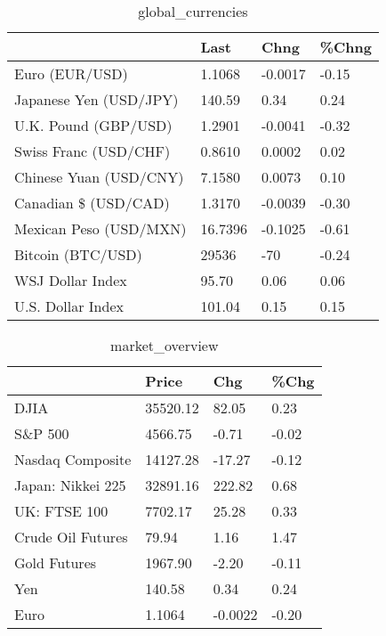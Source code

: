 \documentclass{article}%
\begin{document}
%


\begin{table}[htbp]%
\caption{global\_currencies}%
\centering%
\begin{adjustbox}{width=1\textwidth}%
\begin{tabular}{llll}
\toprule
                       &    Last &    Chng & \%Chng \\
\midrule
        Euro (EUR/USD) &  1.1068 & -0.0017 & -0.15 \\
Japanese Yen (USD/JPY) &  140.59 &    0.34 &  0.24 \\
  U.K. Pound (GBP/USD) &  1.2901 & -0.0041 & -0.32 \\
 Swiss Franc (USD/CHF) &  0.8610 &  0.0002 &  0.02 \\
Chinese Yuan (USD/CNY) &  7.1580 &  0.0073 &  0.10 \\
  Canadian \$ (USD/CAD) &  1.3170 & -0.0039 & -0.30 \\
Mexican Peso (USD/MXN) & 16.7396 & -0.1025 & -0.61 \\
     Bitcoin (BTC/USD) &   29536 &     -70 & -0.24 \\
      WSJ Dollar Index &   95.70 &    0.06 &  0.06 \\
     U.S. Dollar Index &  101.04 &    0.15 &  0.15 \\
\bottomrule
\end{tabular}
%
\end{adjustbox}%
\end{table}

%


\begin{table}[htbp]%
\caption{market\_overview}%
\centering%
\begin{adjustbox}{width=1\textwidth}%
\begin{tabular}{llll}
\toprule
                  &    Price &     Chg &  \%Chg \\
\midrule
             DJIA & 35520.12 &   82.05 &  0.23 \\
          S\&P 500 &  4566.75 &   -0.71 & -0.02 \\
 Nasdaq Composite & 14127.28 &  -17.27 & -0.12 \\
Japan: Nikkei 225 & 32891.16 &  222.82 &  0.68 \\
     UK: FTSE 100 &  7702.17 &   25.28 &  0.33 \\
Crude Oil Futures &    79.94 &    1.16 &  1.47 \\
     Gold Futures &  1967.90 &   -2.20 & -0.11 \\
              Yen &   140.58 &    0.34 &  0.24 \\
             Euro &   1.1064 & -0.0022 & -0.20 \\
\bottomrule
\end{tabular}
%
\end{adjustbox}%
\end{table}

%
\end{document}

